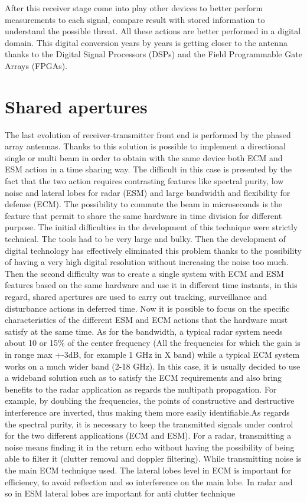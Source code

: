 \documentclass[12pt]{report}
\begin{document}
After this receiver stage come into play other devices to better perform measurements to each signal, compare result with stored information to understand the possible threat. All these actions are better performed in a digital domain. This digital conversion years by years is getting closer to the antenna thanks to the Digital Signal Processors (DSPs) and the Field Programmable Gate Arrays (FPGAs).
\newpage
\section{Shared apertures} The last evolution of receiver-transmitter front end is performed by the phased array antennas. Thanks to this solution is possible to implement a directional single or multi beam in order to obtain with the same device both ECM and ESM action in a time sharing way. The difficult in this case is presented by the fact that the two action requires contrasting features like spectral purity, low noise and lateral lobes for radar (ESM) and large bandwidth and flexibility for defense (ECM). The possibility to commute the beam in microseconds is the feature that permit to share the same hardware in time division for different purpose. The initial difficulties in the development of this technique were strictly technical. The tools had to be very large and bulky. Then the development of digital technology has effectively eliminated this problem thanks to the possibility of having a very high digital resolution without increasing the noise too much. Then the second difficulty was to create a single system with ECM and ESM features based on the same hardware and use it in different time instants, in this regard, shared apertures are used to carry out tracking, surveillance and disturbance actions in deferred time. Now it is possible to focus on the specific characteristics of the different ESM and ECM actions that the hardware must satisfy at the same time. \newline As for the bandwidth, a typical radar system needs about 10 or 15\% of the center frequency (All the frequencies for which the gain is in range max +-3dB, for example 1 GHz in X band) while a typical ECM system works on a much wider band (2-18 GHz). In this case, it is usually decided to use a wideband solution such as to satisfy the ECM requirements and also bring benefits to the radar application as regards the multipath propagation. For example, by doubling the frequencies, the points of constructive and destructive interference are inverted, thus making them more easily identifiable.\newline As regards the spectral purity, it is necessary to keep the transmitted signals under control for the two different applications (ECM and ESM). For a radar, transmitting a noise means finding it in the return echo without having the possibility of being able to filter it (clutter removal and doppler filtering). While transmitting noise is the main ECM technique used. \newline The lateral lobes level in ECM is important for efficiency, to avoid reflection and so interference on the main lobe. In radar and so in ESM lateral lobes are important for anti clutter technique 
\end{document}
